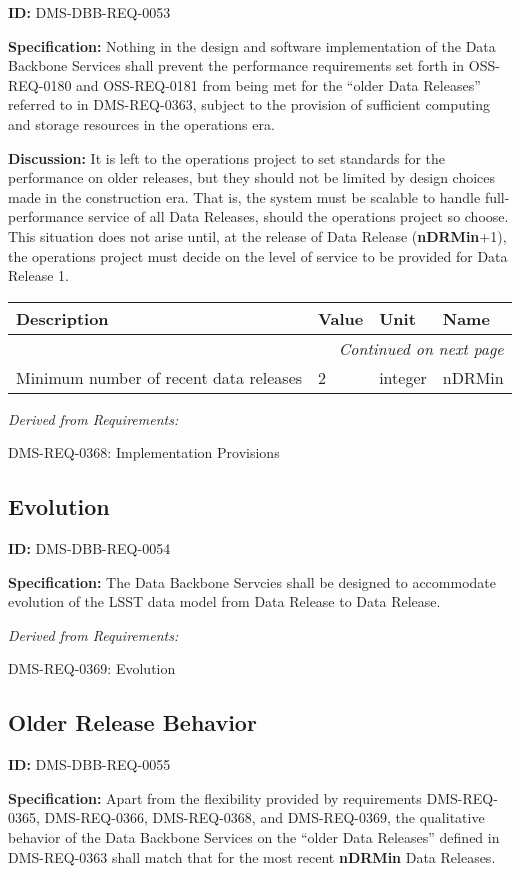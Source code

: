 \documentclass[SE,toc]{lsstdoc}
\makeatletter
\newcommand{\paramname}[1]{\hspace{0pt}#1}
\newcommand{\unitname}[1]{\hspace{0pt}#1}
\newenvironment{parameters}[0]{%
\setlength\LTleft{0pt}
\setlength\LTright{\fill}
\begin{small}
\begin{longtable}[]{|p{0.49\textwidth}|l|p{0.6in}|p{1.70in}@{}|}

\hline \textbf{Description} & \textbf{Value} & \textbf{Unit} & \textbf{Name} \\ \hline
\endhead

\hline \multicolumn{4}{r}{\emph{Continued on next page}} \\
\endfoot

\hline\hline
\endlastfoot
}{%
\hline
\end{longtable}
\end{small}
}
\makeatother
\begin{document}
\label{DMS-DBB-REQ-0053}
\textbf{ID:} DMS-DBB-REQ-0053

\textbf{Specification:}
Nothing in the design and software implementation of the Data Backbone Services shall prevent the performance requirements set forth in OSS-REQ-0180 and OSS-REQ-0181 from being met for the “older Data Releases” referred to in DMS-REQ-0363, subject to the provision of sufficient computing and storage resources in the operations era.

\textbf{Discussion:}
It is left to the operations project to set standards for the performance on older releases, but they should not be limited by design choices made in the construction era. That is, the system must be scalable to handle full-performance service of all Data Releases, should the operations project so choose. This situation does not arise until, at the release of Data Release (\textbf{nDRMin}+1), the operations project must decide on the level of service to be provided for Data Release 1.

\begin{parameters}
Minimum number of recent data releases
&
2
&
\unitname{%
integer
}
&
\paramname{%
nDRMin
} \\\hline
\end{parameters}

\emph{Derived from Requirements:}

DMS-REQ-0368:
Implementation Provisions \newline

\subsection{Evolution}

\label{DMS-DBB-REQ-0054}
\textbf{ID:} DMS-DBB-REQ-0054

\textbf{Specification:}
The Data Backbone Servcies shall be designed to accommodate evolution of the LSST data model from Data Release to Data Release.

\emph{Derived from Requirements:}

DMS-REQ-0369:
Evolution \newline

\subsection{Older Release Behavior}

\label{DMS-DBB-REQ-0055}
\textbf{ID:} DMS-DBB-REQ-0055

\textbf{Specification:}
Apart from the flexibility provided by requirements DMS-REQ-0365, DMS-REQ-0366, DMS-REQ-0368, and DMS-REQ-0369, the qualitative behavior of the Data Backbone Services on the “older Data Releases” defined in DMS-REQ-0363 shall match that for the most recent \textbf{nDRMin} Data Releases.
\end{document}
